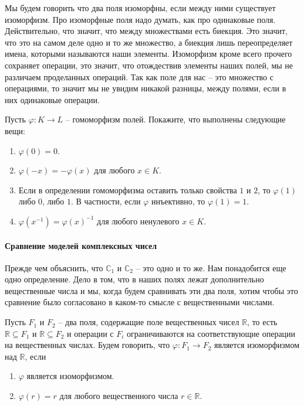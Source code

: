 Мы будем говорить что два поля изоморфны, если между ними существует изоморфизм. Про изоморфные поля надо думать, как про одинаковые поля. Действительно, что значит, что между множествами есть биекция. Это значит, что это на самом деле одно и то же множество, а биекция лишь переопределяет имена, которыми называются наши элементы. Изоморфизм кроме всего прочего сохраняет операции, это значит, что отождествив элементы наших полей, мы не различаем проделанных операций. Так как поле для нас -- это множество с операциями, то значит мы не увидим никакой разницы, между полями, если в них одинаковые операции.

\begin{problems}
Пусть $\varphi\colon K\to L$ -- гомоморфизм полей. Покажите, что выполнены следующие вещи:
\begin{enumerate}
\item $\varphi(0) = 0$.
\item $\varphi(-x) = -\varphi(x)$ для любого $x\in K$.
\item Если в определении гомоморфизма оставить только свойства $1$ и $2$, то $\varphi(1)$ либо $0$, либо $1$. В частности, если $\varphi$ инъективно, то $\varphi(1) = 1$.
\item $\varphi(x^{-1}) = \varphi(x)^{-1}$ для любого ненулевого $x\in K$.
\end{enumerate}
\end{problems}

\paragraph{Сравнение моделей комплексных чисел}

Прежде чем объяснить, что $\mathbb C_1$ и $\mathbb C_2$ -- это одно и то же. Нам понадобится еще одно определение. Дело в том, что в наших полях лежат дополнительно вещественные числа и мы, когда будем сравнивать эти два поля, хотим чтобы это сравнение было согласовано в каком-то смысле с вещественными числами.

\begin{definition}
Пусть $F_1$ и $F_2$ -- два поля, содержащие поле вещественных чисел $\mathbb R$, то есть $\mathbb R\subseteq F_1$ и $\mathbb R\subseteq F_2$ и операции с $F_i$ ограничиваются на соответствующие операции на вещественных числах. Будем говорить, что $\varphi\colon F_1\to F_2$ является изоморфизмом над $\mathbb R$, если 
\begin{enumerate}
\item $\varphi$ является изоморфизмом.
\item $\varphi(r) = r$ для любого вещественного числа $r\in \mathbb R$.
\end{enumerate}
\end{definition}

